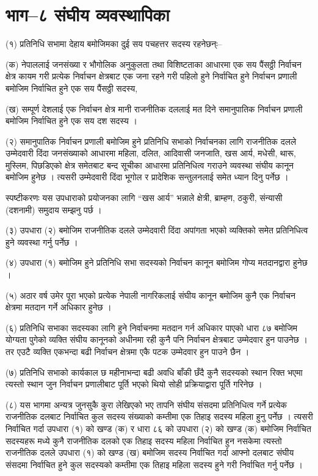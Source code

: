 \section{भाग–८ संघीय व्यवस्थापिका}

(१) प्रतिनिधि सभामा देहाय बमोजिमका दुई सय पचहत्तर सदस्य रहनेछन्ः–

(क) नेपाललाई जनसंख्या र भौगोलिक अनुकुलता तथा विशिष्टताका आधारमा एक सय पैंसठ्ठी निर्वाचन क्षेत्र कायम गरी प्रत्येक निर्वाचन क्षेत्रबाट एक जना रहने गरी पहिलो हुने निर्वाचित हुने निर्वाचन प्रणाली बमोजिम निर्वाचित हुने एक सय पैंसठ्ठी सदस्य,

(ख) सम्पूर्ण देशलाई एक निर्वाचन क्षेत्र मानी राजनीतिक दललाई मत दिने समानुपातिक निर्वाचन प्रणाली बमोजिम निर्वाचित
हुने एक सय दश सदस्य ।

(२) समानुपातिक निर्वाचन प्रणाली बमोजिम हुने प्रतिनिधि सभाको निर्वाचनका लागि राजनीतिक दलले उम्मेदवारी दिंदा जनसंख्याको आधारमा महिला, दलित, आदिवासी जनजाति, खस आर्य, मधेसी, थारू, मुस्लिम, पिछडिएको क्षेत्र समेतबाट बन्द सूचीका आधारमा प्रतिनिधित्व गराउने व्यवस्था संघीय कानून बमोजिम हुनेछ । त्यसरी उम्मेदवारी दिंदा भूगोल र प्रादेशिक सन्तुलनलाई समेत ध्यान दिनु पर्नेछ ।

स्पष्टीकरणः यस उपधाराको प्रयोजनका लागि “खस आर्य” भन्नाले क्षेत्री, ब्राम्हण, ठकुरी, संन्यासी (दशनामी) समुदाय सम्झनु पर्छ ।

(३) उपधारा (२) बमोजिम राजनीतिक दलले उम्मेदवारी दिंदा अपांगता भएको व्यक्तिको समेत प्रतिनिधित्व हुने व्यवस्था गर्नु पर्नेछ ।

(४) उपधारा (१) बमोजिम हुने प्रतिनिधि सभा सदस्यको निर्वाचन कानून बमोजिम गोप्य मतदानद्वारा हुनेछ ।

(५) अठार वर्ष उमेर पूरा भएको प्रत्येक नेपाली नागरिकलाई संघीय कानून बमोजिम कुनै एक निर्वाचन क्षेत्रमा मतदान गर्ने अधिकार हुनेछ ।

(६) प्रतिनिधि सभाका सदस्यका लागि हुने निर्वाचनमा मतदान गर्न अधिकार पाएको धारा ८७ बमोजिम योग्यता पुगेको व्यक्ति संघीय कानूनको अधीनमा रही कुनै पनि निर्वाचन क्षेत्रबाट उम्मेदवार हुन पाउनेछ । तर एउटै व्यक्ति एकभन्दा बढी निर्वाचन क्षेत्रमा एकै पटक उम्मेदवार हुन पाउने छैन ।

(७) प्रतिनिधि सभाको कार्यकाल छ महीनाभन्दा बढी अवधि बाँकी छँदै कुनै सदस्यको स्थान रिक्त भएमा त्यस्तो स्थान जुन निर्वाचन प्रणालीबाट पूर्ति भएको थियो सोही प्रक्रियाद्वारा पूर्ति गरिनेछ ।

(८) यस भागमा अन्यत्र जुनसुकै कुरा लेखिएको भए तापनि संघीय संसदमा प्रतिनिधित्व गर्ने प्रत्येक राजनीतिक दलबाट निर्वाचित कुल सदस्य संख्याको कम्तीमा एक तिहाइ सदस्य महिला हुनु पर्नेछ । त्यसरी निर्वाचित गर्दा उपधारा (१) को खण्ड (क) र धारा ८६ को उपधारा (२) को खण्ड (क) बमोजिम निर्वाचित सदस्यहरू मध्ये कुनै राजनीतिक दलको एक तिहाइ सदस्य महिला निर्वाचित हुन नसकेमा त्यस्तो राजनीतिक दलले उपधारा (१) को खण्ड (ख) बमोजिम सदस्य निर्वाचित गर्दा आफ्नो दलबाट संघीय संसदमा निर्वाचित हुने कुल सदस्यको कम्तीमा एक तिहाइ महिला सदस्य हुने गरी निर्वाचित गर्नु पर्नेछ ।

